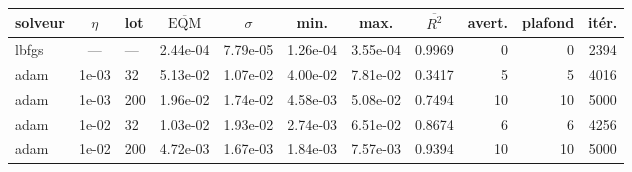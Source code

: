 \begin{tabular}{l S[table-format=1e-2] l S[table-format=1.2e-2] S[table-format=1.2e-2] S[table-format=1.2e-2] S[table-format=1.2e-2] S[table-format=1.4] r r S[table-format=4]}
\toprule
{solveur} & {\(\eta\)} & {lot} & {\(\overline{\mathrm{EQM}}\)} & {\(\sigma\)} & {min.} & {max.} & {\(\overline{R^2}\)} & {avert.} & {plafond} & {it\'er.} \\
\midrule
lbfgs & {---} & --- & 2.44e-04 & 7.79e-05 & 1.26e-04 & 3.55e-04 & 0.9969 & 0 & 0 & 2394 \\
adam & 1e-03 & 32 & 5.13e-02 & 1.07e-02 & 4.00e-02 & 7.81e-02 & 0.3417 & 5 & 5 & 4016 \\
adam & 1e-03 & 200 & 1.96e-02 & 1.74e-02 & 4.58e-03 & 5.08e-02 & 0.7494 & 10 & 10 & 5000 \\
adam & 1e-02 & 32 & 1.03e-02 & 1.93e-02 & 2.74e-03 & 6.51e-02 & 0.8674 & 6 & 6 & 4256 \\
adam & 1e-02 & 200 & 4.72e-03 & 1.67e-03 & 1.84e-03 & 7.57e-03 & 0.9394 & 10 & 10 & 5000 \\
\bottomrule
\end{tabular}
